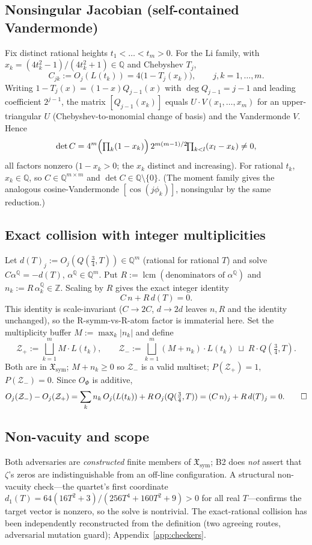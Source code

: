 \documentclass[11pt]{article}
\theoremstyle{plain}
\theoremstyle{definition}
\theoremstyle{remark}
\newcommand{\Xsym}{\mathfrak{X}_{\mathrm{sym}}}
\newcommand{\Zp}{\mathcal{Z}_+}
\newcommand{\Zm}{\mathcal{Z}_-}
\begin{document}
\subsection{Nonsingular Jacobian (self-contained Vandermonde)}
Fix distinct rational heights $t_1<\dots<t_m>0$. For the Li family, with
$x_k=(4t_k^2-1)/(4t_k^2+1)\in\mathbb Q$ and Chebyshev $T_j$,
\[
  C_{jk}:=O_j(L(t_k))=4\bigl(1-T_j(x_k)\bigr),\qquad j,k=1,\dots,m.
\]
Writing $1-T_j(x)=(1-x)Q_{j-1}(x)$ with $\deg Q_{j-1}=j-1$ and leading coefficient $2^{j-1}$,
the matrix $[Q_{j-1}(x_k)]$ equals $U\cdot V(x_1,\dots,x_m)$ for an upper-triangular $U$
(Chebyshev-to-monomial change of basis) and the Vandermonde $V$. Hence
\[
  \det C = 4^m\Bigl(\textstyle\prod_k(1-x_k)\Bigr)\,2^{m(m-1)/2}\!\!\prod_{k<l}(x_l-x_k)\neq 0,
\]
all factors nonzero ($1-x_k>0$; the $x_k$ distinct and increasing). For rational $t_k$,
$x_k\in\mathbb Q$, so $C\in\mathbb Q^{m\times m}$ and $\det C\in\mathbb Q\setminus\{0\}$. (The
moment family gives the analogous cosine-Vandermonde $[\cos(j\phi_k)]$, nonsingular by the same
reduction.)

\subsection{Exact collision with integer multiplicities}
Let $d(T)_j:=O_j(Q(\tfrac34,T))\in\mathbb Q^m$ (rational for rational $T$) and solve
$C\alpha^{\mathbb Q}=-d(T)$, $\alpha^{\mathbb Q}\in\mathbb Q^m$. Put
$R:=\operatorname{lcm}(\text{denominators of }\alpha^{\mathbb Q})$ and
$n_k:=R\,\alpha^{\mathbb Q}_k\in\mathbb Z$. Scaling by $R$ gives the exact integer identity
\[
  C\,n + R\,d(T)=0.
\]
This identity is scale-invariant ($C\to 2C$, $d\to 2d$ leaves $n,R$ and the identity
unchanged), so the R-symm-vs-R-atom factor is immaterial here. Set the multiplicity buffer
$M:=\max_k|n_k|$ and define
\[
  \Zp:=\bigsqcup_{k=1}^m M\cdot L(t_k),\qquad
  \Zm:=\bigsqcup_{k=1}^m (M+n_k)\cdot L(t_k)\;\sqcup\; R\cdot Q(\tfrac34,T).
\]
Both are in $\Xsym$; $M+n_k\ge 0$ so $\Zm$ is a valid multiset; $P(\Zp)=1$, $P(\Zm)=0$. Since
$O_\Phi$ is additive,
\[
  O_j(\Zm)-O_j(\Zp)=\sum_k n_k\,O_j(L(t_k))+R\,O_j(Q(\tfrac34,T))=(C\,n)_j+R\,d(T)_j=0. \qedhere
\]

\subsection{Non-vacuity and scope}
Both adversaries are \emph{constructed} finite members of $\Xsym$; B2 does \emph{not} assert
that $\zeta$'s zeros are indistinguishable from an off-line configuration. A structural
non-vacuity check---the quartet's first coordinate
$d_1(T)=64(16T^2+3)/(256T^4+160T^2+9)>0$ for all real $T$---confirms the target vector is
nonzero, so the solve is nontrivial. The exact-rational collision has been independently
reconstructed from the definition (two agreeing routes, adversarial mutation guard);
Appendix~\ref{app:checkers}.
\end{document}
